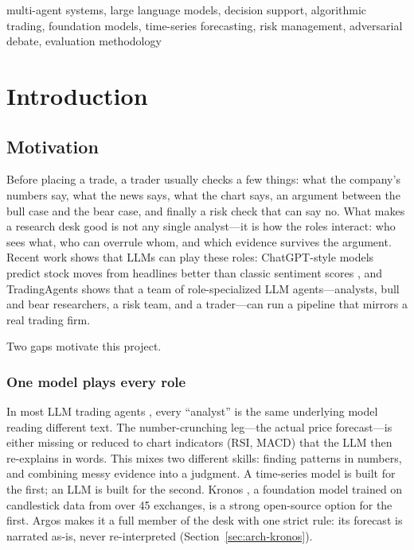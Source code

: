 \documentclass[conference]{IEEEtran}
\newcommand{\sys}{Argos}
\begin{document}
\begin{IEEEkeywords}
multi-agent systems, large language models, decision support, algorithmic trading, foundation models, time-series forecasting, risk management, adversarial debate, evaluation methodology
\end{IEEEkeywords}

\section{Introduction}

\subsection{Motivation}

Before placing a trade, a trader usually checks a few things: what the company's numbers say, what the news says, what the chart says, an argument between the bull case and the bear case, and finally a risk check that can say no. What makes a research desk good is not any single analyst---it is how the roles interact: who sees what, who can overrule whom, and which evidence survives the argument. Recent work shows that LLMs can play these roles: ChatGPT-style models predict stock moves from headlines better than classic sentiment scores \cite{lopezlira2023chatgpt}, and TradingAgents \cite{xiao2024tradingagents} shows that a team of role-specialized LLM agents---analysts, bull and bear researchers, a risk team, and a trader---can run a pipeline that mirrors a real trading firm.

Two gaps motivate this project.

\subsubsection{One model plays every role} In most LLM trading agents \cite{xiao2024tradingagents,yu2023finmem}, every ``analyst'' is the same underlying model reading different text. The number-crunching leg---the actual price forecast---is either missing or reduced to chart indicators (RSI, MACD) that the LLM then re-explains in words. This mixes two different skills: finding patterns in numbers, and combining messy evidence into a judgment. A time-series model is built for the first; an LLM is built for the second. Kronos \cite{shi2025kronos}, a foundation model trained on candlestick data from over 45 exchanges, is a strong open-source option for the first. \sys{} makes it a full member of the desk with one strict rule: its forecast is narrated as-is, never re-interpreted (Section~\ref{sec:arch-kronos}).
\end{document}
